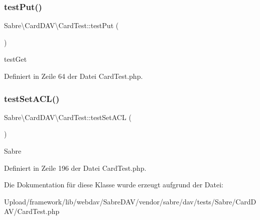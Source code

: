 \subsubsection{\texorpdfstring{test\+Put()}{testPut()}}
{\footnotesize\ttfamily Sabre\textbackslash{}\+Card\+D\+A\+V\textbackslash{}\+Card\+Test\+::test\+Put (\begin{DoxyParamCaption}{ }\end{DoxyParamCaption})}

test\+Get 

Definiert in Zeile 64 der Datei Card\+Test.\+php.

\mbox{\label{class_sabre_1_1_card_d_a_v_1_1_card_test_a66754817c039eb5feb28156b7156900d}} 
\subsubsection{\texorpdfstring{test\+Set\+A\+C\+L()}{testSetACL()}}
{\footnotesize\ttfamily Sabre\textbackslash{}\+Card\+D\+A\+V\textbackslash{}\+Card\+Test\+::test\+Set\+A\+CL (\begin{DoxyParamCaption}{ }\end{DoxyParamCaption})}

Sabre 

Definiert in Zeile 196 der Datei Card\+Test.\+php.



Die Dokumentation für diese Klasse wurde erzeugt aufgrund der Datei\+:\begin{DoxyCompactItemize}
\item 
Upload/framework/lib/webdav/\+Sabre\+D\+A\+V/vendor/sabre/dav/tests/\+Sabre/\+Card\+D\+A\+V/Card\+Test.\+php\end{DoxyCompactItemize}
